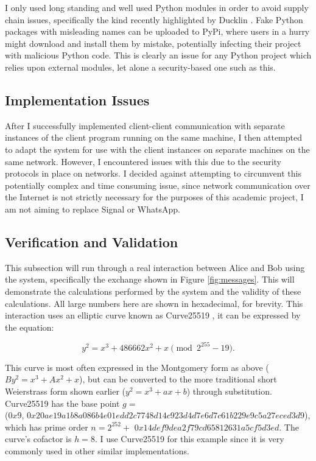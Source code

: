 \documentclass[12pt,a4paper]{article}
\begin{document}
I only used long standing and well used Python modules in order to avoid supply chain issues, 
specifically the kind recently highlighted by Ducklin \citeyear{ducklin2021python}. 
Fake Python packages with misleading names can be uploaded to PyPi, where users in a hurry might download and install them by mistake, 
potentially infecting their project with malicious Python code. 
This is clearly an issue for any Python project which relies upon external modules, let alone a security-based one such as this. 


\subsection{Implementation Issues} \noindent \label{Implementation}
After I successfully implemented client-client communication with separate instances of the client program running on the 
same machine, I then attempted to adapt the system for use with the client instances on separate machines on the same network. 
However, I encountered issues with this due to the security protocols in place on networks. 
I decided against attempting to circumvent this potentially complex and time consuming issue, 
since network communication over the Internet is not strictly necessary for the purposes of this academic project, 
I am not aiming to replace Signal or WhatsApp. 


\subsection{Verification and Validation} \noindent \label{Verification}
This subsection will run through a real interaction between Alice and Bob using the system, 
specifically the exchange shown in Figure \ref{fig:messages}. 
This will demonstrate the calculations performed by the system and the validity of these calculations. 
All large numbers here are shown in hexadecimal, for brevity. 
This interaction uses an elliptic curve known as Curve25519 \cite{10.1007/11745853_14}, 
it can be expressed by the equation: 

\begin{equation}
    y^2 = x^3 + 486662x^2 + x \pmod{2^{255}-19}.
\end{equation}

This curve is most often expressed in the Montgomery \citeyear{montgomery1987speeding} form as above ($By^2 = x^3 + Ax^2 + x$), 
but can be converted to the more traditional short Weierstrass form shown earlier ($y^2 = x^3 + ax + b$) through substitution. 
Curve25519 has the base point $g = $ \\
({\footnotesize $0x9$}, {\footnotesize $0x20ae19a1b8a086b4e01edd2c7748d14c923d4d7e6d7c61b229e9c5a27eced3d9$}), \\
which has prime order $n = 2^{252} +$ {\footnotesize $0x14def9dea2f79cd65812631a5cf5d3ed$}. 
The curve's cofactor is $h = 8$. 
I use Curve25519 for this example since it is very commonly used in other similar implementations. 
\end{document}
